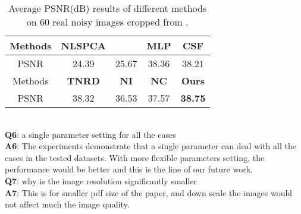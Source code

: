 \documentclass[10pt,twocolumn,letterpaper]{article}
\begin{document}
\begin{table}\vspace{1.5mm}
\caption{Average PSNR(dB) results of different methods on 60 real noisy images cropped from \cite{crosschannel2016}.}
\vspace{-3mm}
\label{tab3}
\begin{center}
\renewcommand\arraystretch{1}
\begin{tabular}{|c||c|c|c|c|}
\hline
 Methods& \textbf{NLSPCA} & \cite{makitalo2013optimal} & \textbf{MLP}&\textbf{CSF}
\\
\hline
PSNR & 24.39  &  25.67 &  38.36 & 38.21
\\
\hline
Methods & \textbf{TNRD} & \textbf{NI} & \textbf{NC} &\textbf{Ours} 
\\
\hline
PSNR & 38.32  & 36.53 & 37.57 & {\textbf{{ 38.75}}}
\\
\hline
\end{tabular}
\end{center}\vspace{-4mm}
\end{table}
\\
\textbf{Q6}: a single parameter setting for all the cases 
\\
\textbf{A6}: The experiments demonstrate that a single parameter can deal with all the cases in the tested datasets. With more flexible parameters setting, the performance would be better and this is the line of our future work.
\\
\textbf{Q7}: why is the image resolution significantly smaller
\\
\textbf{A7}: This is for smaller pdf size of the paper, and down scale the images would not affect much the image quality.



{\small


}
\end{document}
